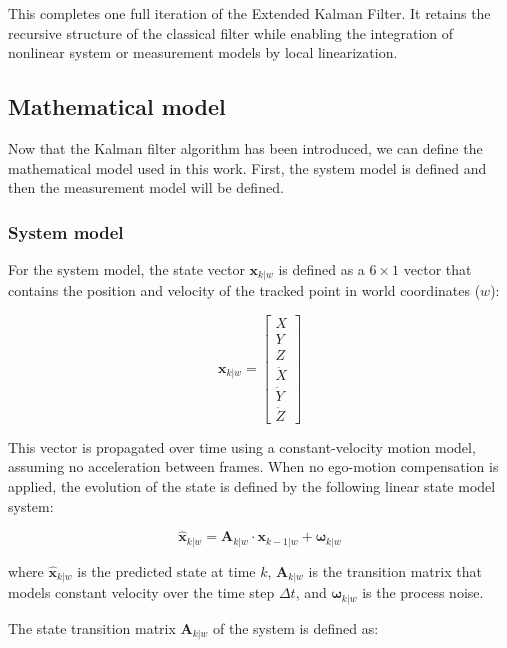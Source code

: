 This completes one full iteration of the Extended Kalman Filter. It retains the recursive structure of the
classical filter while enabling the integration of nonlinear system or measurement models by local
linearization.

\subsection{Mathematical model}\label{sec:KalmanFilterMathematicalModel}

Now that the Kalman filter algorithm has been introduced, we can define the mathematical model used
in this work. First, the system model is defined and then the measurement model will be defined. 

\subsubsection{System model}

For the system model, the state vector $\mathbf{x}_{k|w}$ is defined as a $6 \times 1$ vector that contains the
position and velocity of the tracked point in world coordinates ($w$):

\begin{equation}
  \mathbf{x}_{k|w} =
  \begin{bmatrix}
    X \\
    Y \\
    Z \\
    \dot{X} \\
    \dot{Y} \\
    \dot{Z}
  \end{bmatrix}
\end{equation}

This vector is propagated over time using a constant-velocity motion model, assuming no acceleration between
frames. When no ego-motion compensation is applied, the evolution of the state is defined by the following 
linear state model system:

\begin{equation}
  \hat{\mathbf{x}}_{k|w} = \mathbf{A}_{k|w} \cdot \mathbf{x}_{k-1|w} + \boldsymbol{\omega}_{k|w}
\end{equation}

where $\hat{\mathbf{x}}_{k|w}$ is the predicted state at time $k$, $\mathbf{A}_{k|w}$ is the transition matrix 
that models constant velocity over the time step $\Delta t$, and $\boldsymbol{\omega}_{k|w}$ is the process noise.

The state transition matrix $\mathbf{A}_{k|w}$ of the system is defined as: 

